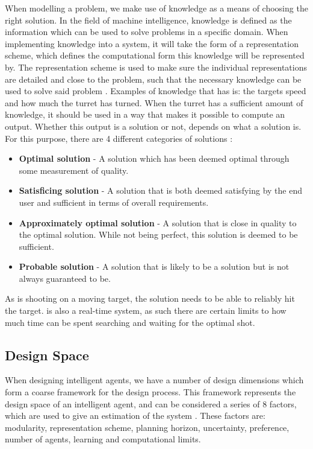 When modelling a problem, we make use of knowledge as a means of choosing the
right solution. In the field of machine intelligence, knowledge is defined as
the information which can be used to solve problems in a specific
domain. When implementing knowledge into a system, it will take the form of a
representation scheme, which defines the computational form this knowledge will
be represented by. The representation scheme is used to make sure the individual
representations are detailed and close to the problem, such that the necessary
knowledge can be used to solve said problem \citep[ch.1.4]{MIBook}.
Examples of knowledge that \name has is: the targets speed and how much the turret has
turned. When the turret has a sufficient amount of knowledge, it should be used
in a way that makes it possible to compute an output. Whether this output is a
solution or not, depends on what a solution is. For this purpose, there are 4
different categories of solutions \citep[ch.1.4.1]{MIBook}:

\begin{itemize}
  \item \textbf{Optimal solution} - A solution which has been deemed optimal
  through some measurement of quality.
  \item \textbf{Satisficing solution} - A solution that is both deemed
  satisfying by the end user and sufficient in terms of overall requirements. 
  \item \textbf{Approximately optimal solution} - A solution that is close in
  quality to the optimal solution. While not being perfect, this solution is
  deemed to be sufficient.
  \item \textbf{Probable solution} - A solution that is likely to be a solution
  but is not always guaranteed to be.
\end{itemize}

As \name is shooting on a moving target, the solution needs to be able
to  reliably hit the target. \name is also a real-time system, as such there are
certain limits to how much time can be spent searching and waiting for the
optimal shot.

\subsection{Design Space}
When designing intelligent agents, we have a number of design dimensions which
form a coarse framework for the design process. This framework represents the
design space of an intelligent agent, and can be considered a series of 8
factors, which are used to give an estimation of the system
\citep[ch.1.5]{MIBook}. These factors are: modularity, representation scheme,
planning horizon, uncertainty, preference, number of agents, learning and
computational limits.

